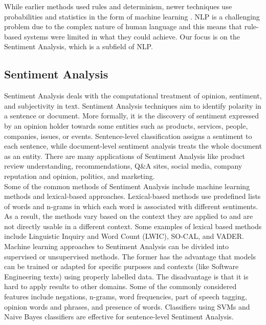 \documentclass[conference]{IEEEtran}
\begin{document}
While earlier methods used  rules and determinism, newer techniques use probabilities and statistics in the form of machine learning \cite{b8}. NLP is a challenging problem due to the complex nature of human language and this means that rule-based systems were limited in what they could achieve. Our focus is on the Sentiment Analysis, which is a subfield of NLP. \\

\subsection{Sentiment Analysis}
Sentiment Analysis deals with the computational treatment of opinion, sentiment, and subjectivity in text. Sentiment Analysis techniques aim to identify polarity in a sentence or document. More formally, it is the discovery of sentiment expressed by an opinion holder towards some entities such as products, services, people, companies, issues, or events. Sentence-level classification assigns a sentiment to each sentence, while document-level sentiment analysis treats the whole document as an entity. There are many applications of Sentiment Analysis like product review understanding, recommendations, Q\&A sites, social media, company reputation and opinion, politics, and marketing. \cite{b10, b13, b19}\\

Some of the common methods of Sentiment Analysis include machine learning methods and lexical-based approaches. Lexical-based methods use predefined lists of words and n-grams in which each word is associated with different sentiments. As a result, the methods vary based on the context they are applied to and are not directly usable in a different context. Some examples of lexical based methods include Linguistic Inquiry and Word Count (LWIC), SO-CAL, and VADER.\cite{b11, b13}\\

Machine learning approaches to Sentiment Analysis can be divided into supervised or unsupervised methods. The former has the advantage that models can be trained or adapted for specific purposes and contexts (like Software Engineering texts) using properly labelled data. The disadvantage is that it is hard to apply results to other domains. Some of the commonly considered features include negations, n-grams, word frequencies, part of speech tagging, opinion words and phrases, and presence of words. Classifiers using SVMs and Naive Bayes classifiers are effective for sentence-level Sentiment Analysis.\cite{b11, b13, b14}\\
\end{document}
